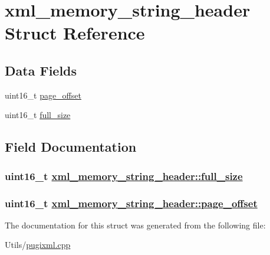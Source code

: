 \hypertarget{structxml__memory__string__header}{
\section{xml\_\-memory\_\-string\_\-header Struct Reference}
\label{structxml__memory__string__header}
}
\subsection*{Data Fields}
\begin{CompactItemize}
\item 
uint16\_\-t \hyperlink{structxml__memory__string__header_0cc274672f1263f73eeb6bf839bf96ee}{page\_\-offset}
\item 
uint16\_\-t \hyperlink{structxml__memory__string__header_bbb48a709081e6610dffad322499e3f7}{full\_\-size}
\end{CompactItemize}


\subsection{Field Documentation}
\hypertarget{structxml__memory__string__header_bbb48a709081e6610dffad322499e3f7}{
\subsubsection[full\_\-size]{\setlength{\rightskip}{0pt plus 5cm}uint16\_\-t \hyperlink{structxml__memory__string__header_bbb48a709081e6610dffad322499e3f7}{xml\_\-memory\_\-string\_\-header::full\_\-size}}}
\label{structxml__memory__string__header_bbb48a709081e6610dffad322499e3f7}


\hypertarget{structxml__memory__string__header_0cc274672f1263f73eeb6bf839bf96ee}{
\subsubsection[page\_\-offset]{\setlength{\rightskip}{0pt plus 5cm}uint16\_\-t \hyperlink{structxml__memory__string__header_0cc274672f1263f73eeb6bf839bf96ee}{xml\_\-memory\_\-string\_\-header::page\_\-offset}}}
\label{structxml__memory__string__header_0cc274672f1263f73eeb6bf839bf96ee}




The documentation for this struct was generated from the following file:\begin{CompactItemize}
\item 
Utils/\hyperlink{pugixml_8cpp}{pugixml.cpp}\end{CompactItemize}
